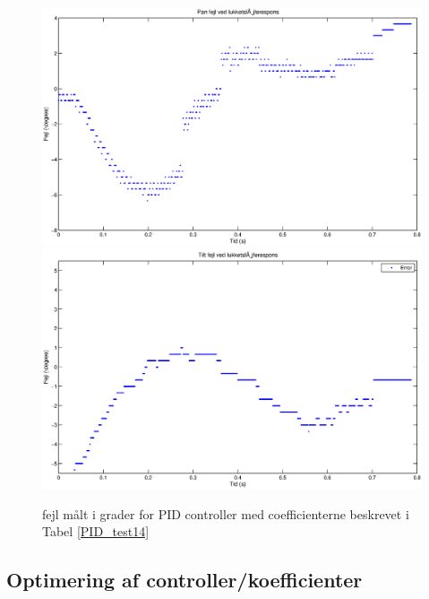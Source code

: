 \begin{figure}
\includegraphics[width=1\textwidth]{./graphics/error_pan.eps}
\includegraphics[width=1\textwidth]{./graphics/error_tilt.eps}
\caption{fejl målt i grader for PID controller med coefficienterne beskrevet i Tabel \ref{PID_test14} \label{PID_test14_plot} }
\end{figure}

\subsection{Optimering af controller/koefficienter}
